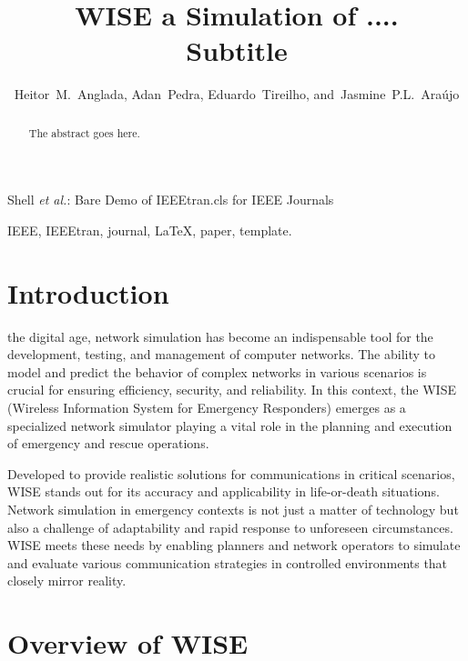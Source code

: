 \documentclass[journal]{IEEEtran}
\begin{document}
\title{WISE a Simulation of ....\\ Subtitle}


\author{Heitor~M.~Anglada, Adan~Pedra, Eduardo~Tireilho, and~Jasmine~P.L.~Araújo}



%
{Shell \MakeLowercase{\textit{et al.}}: Bare Demo of IEEEtran.cls for IEEE Journals}

\maketitle

\begin{abstract}
The abstract goes here.
\end{abstract}

\begin{IEEEkeywords}
IEEE, IEEEtran, journal, \LaTeX, paper, template.
\end{IEEEkeywords}

\IEEEpeerreviewmaketitle



\section{Introduction}
 the digital age, network simulation has become an indispensable tool for the development, testing, and management of computer networks. The ability to model and predict the behavior of complex networks in various scenarios is crucial for ensuring efficiency, security, and reliability. In this context, the WISE (Wireless Information System for Emergency Responders) emerges as a specialized network simulator playing a vital role in the planning and execution of emergency and rescue operations.

Developed to provide realistic solutions for communications in critical scenarios, WISE stands out for its accuracy and applicability in life-or-death situations. Network simulation in emergency contexts is not just a matter of technology but also a challenge of adaptability and rapid response to unforeseen circumstances. WISE meets these needs by enabling planners and network operators to simulate and evaluate various communication strategies in controlled environments that closely mirror reality.

\section{Overview of WISE}
\end{document}
